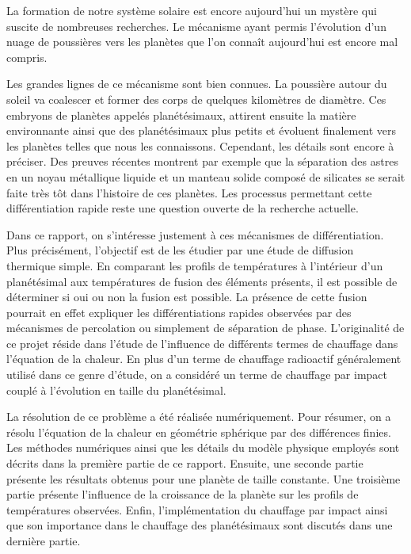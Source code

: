 \documentclass[10pt,a4paper]{article}
\numberwithin{equation}{section}
\begin{document}
La formation de notre système solaire est encore aujourd'hui un mystère qui suscite de nombreuses recherches. Le mécanisme ayant permis l'évolution d'un nuage de poussières vers les planètes que l'on connaît aujourd'hui est encore mal compris. 
\medskip

Les grandes lignes de ce mécanisme sont bien connues. La poussière autour du soleil va coalescer et former des corps de quelques kilomètres de diamètre. Ces embryons de planètes appelés planétésimaux, attirent ensuite la matière environnante ainsi que des planétésimaux plus petits et évoluent finalement vers les planètes telles que nous les connaissons.
Cependant, les détails sont encore à préciser. Des preuves récentes montrent par exemple que la séparation des astres en un noyau métallique liquide et un manteau solide composé de silicates se serait faite très tôt dans l'histoire de ces planètes. Les processus permettant cette différentiation rapide reste une question ouverte de la recherche actuelle. 
\medskip

Dans ce rapport, on s'intéresse justement à ces mécanismes de différentiation. Plus précisément, l'objectif est de les étudier par une étude de diffusion thermique simple. En comparant les profils de températures à l'intérieur d'un planétésimal aux températures de fusion des éléments présents, il est possible de déterminer si oui ou non la fusion est possible. La présence de cette fusion pourrait en effet expliquer les différentiations rapides observées par des mécanismes de percolation ou simplement de séparation de phase. 
L'originalité de ce projet réside dans l'étude de l'influence de différents termes de chauffage dans l'équation de la chaleur. En plus d'un terme de chauffage radioactif généralement utilisé dans ce genre d'étude, on a considéré un terme de chauffage par impact couplé à l'évolution en taille du planétésimal.
\medskip

La résolution de ce problème a été réalisée numériquement. Pour résumer, on a résolu l'équation de la chaleur en géométrie sphérique par des différences finies. Les méthodes numériques ainsi que les détails du modèle physique employés sont décrits dans la première partie de ce rapport. Ensuite, une seconde partie présente les résultats obtenus pour une planète de taille constante. Une troisième partie présente l'influence de la croissance de la planète sur les profils de températures observées. Enfin, l'implémentation du chauffage par impact ainsi que son importance dans le chauffage des planétésimaux sont discutés dans une dernière partie.
\end{document}
